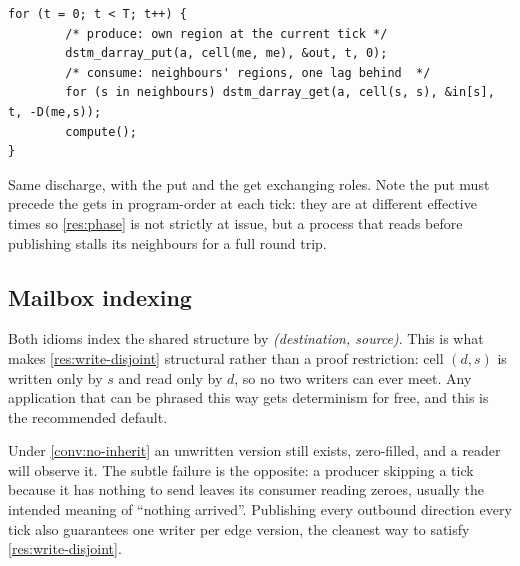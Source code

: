 \begin{lstlisting}
for (t = 0; t < T; t++) {
        /* produce: own region at the current tick */
        dstm_darray_put(a, cell(me, me), &out, t, 0);
        /* consume: neighbours' regions, one lag behind  */
        for (s in neighbours) dstm_darray_get(a, cell(s, s), &in[s], t, -D(me,s));
        compute();
}
\end{lstlisting}

Same discharge, with the put and the get exchanging roles. Note the put must
precede the gets in \gls{program-order} at each tick: they are at different
effective times so \cref{res:phase} is not strictly at issue, but a \gls{process} that
reads before publishing stalls its neighbours for a full round trip.

\subsection*{Mailbox indexing}

Both idioms index the shared structure by \emph{(destination, source)}. This
is what makes \cref{res:write-disjoint} structural rather than a proof
restriction: cell $(d,s)$ is written only by $s$ and read only by $d$, so no
two writers can ever meet. Any application that can be phrased this way gets
determinism for free, and this is the recommended default.

\begin{remark}\label{rem:publish-empty}
Under \cref{conv:no-inherit} an unwritten \gls{version} still exists,
zero-filled, and a reader will observe it. The subtle failure is the opposite:
a producer skipping a tick because it has nothing to send leaves its consumer
reading zeroes, usually the intended meaning of ``nothing arrived''.
Publishing every outbound direction every tick also guarantees one writer per
edge version, the cleanest way to satisfy \cref{res:write-disjoint}.
\end{remark}